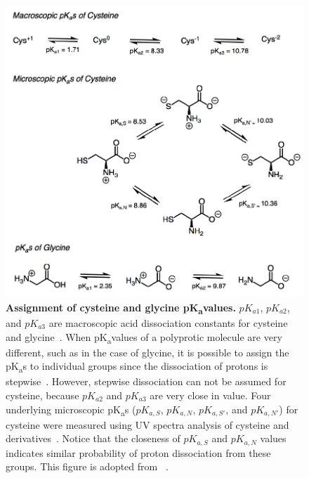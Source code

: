 \documentclass[9pt,lineno]{elife}
\newcommand{\pKa}{pK\textsubscript{a}}
\begin{document}
\begin{figure}
\begin{center}
\includegraphics[width=0.65\linewidth]{figures/cysteine_vs_glycine_fig.pdf}
\caption{{\bf Assignment of cysteine and glycine \pKa values.}  $pK_{a1}$, $pK_{a2}$, and $pK_{a3}$ are macroscopic acid dissociation constants for cysteine and glycine~\citep{sober_handbook_1970}. When \pKa values of a polyprotic molecule are very different, such as in the case of glycine, it is possible to assign the \pKa s to individual groups since the dissociation of protons is stepwise~\citep{bodner_assigning_1986}. However, stepwise dissociation can not be assumed for cysteine, because $pK_{a2}$ and $pK_{a3}$ are very close in value. Four underlying microscopic \pKa s ($pK_{a,S}$, $pK_{a,N}$, $pK_{a,S'}$, and $pK_{a,N'}$) for cysteine were measured using UV spectra analysis of cysteine and derivatives~\citep{doi:10.1021/ja01627a030}. Notice that the closeness of $pK_{a,S}$ and $pK_{a,N}$ values indicates similar probability of proton dissociation from these groups. This figure is adopted from ~\citep{bodner_assigning_1986}. 
}
\label{fig:cys_vs_gly}
\end{center}
\end{figure}
\end{document}

